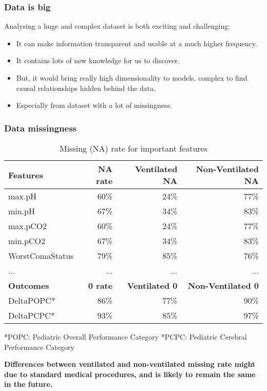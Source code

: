\documentclass{beamer}
\begin{document}
\begin{frame}
\frametitle{Data is big}
Analysing a huge and complex dataset is both exciting and challenging:
\pause
\begin{itemize}
\item It can make information transparent and usable at a much higher frequency. 
\item It contains lots of new knowledge for us to discover. 
\pause
\item But, it would bring really high dimensionality to models, complex to find causal relationships hidden behind the data.
\pause
\item Especially from dataset with a lot of missingness.
\end{itemize}
\end{frame}
\begin{frame}
\frametitle{Data missingness}
\begin{table}
\begin{tabular}{l r r r}
\toprule
\textbf{Features} & \textbf{NA rate} & \textbf{Ventilated NA} & \textbf{Non-Ventilated NA}\\
\midrule
max.pH & 60\% & 24\% & 77\%\\
min.pH & 67\% & 34\% & 83\%\\
max.pCO2 & 60\% & 24\% & 77\%\\
min.pCO2 & 67\% & 34\% & 83\%\\
WorstComaStatus & 79\% & 85\% & 76\%\\
... & ...&...&...\\
\toprule
\textbf{Outcomes} & \textbf{0 rate} & \textbf{Ventilated 0} & \textbf{Non-Ventilated 0}\\
DeltaPOPC* & 86\% & 77\% & 90\%\\
DeltaPCPC* & 93\% & 85\% & 97\%\\
\bottomrule
\end{tabular}
\caption{Missing (NA) rate for important features}
\fontsize{2mm}{1mm}\selectfont
*POPC: Pediatric Overall Performance Category
\fontsize{2mm}{1mm}\selectfont
*PCPC: Pediatric Cerebral Performance Category
\end{table}
\pause
\fontsize{3mm}{6mm}\selectfont
\textbf{Differences between ventilated and non-ventilated missing rate might due to standard medical procedures, and is likely to remain the same in the future.}
\end{frame}
\end{document}
